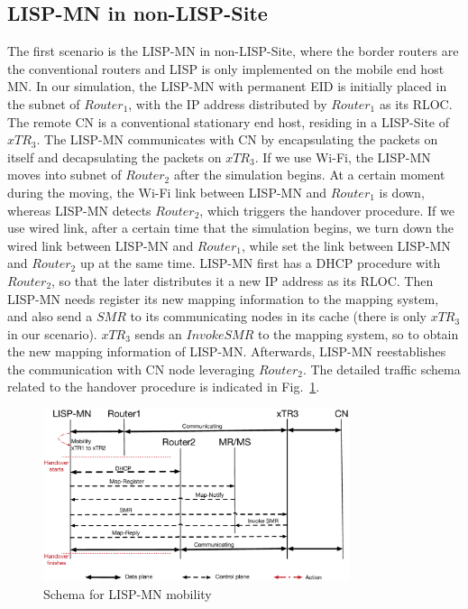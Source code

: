 


\subsection{LISP-MN in non-LISP-Site}
\label{sec:ns3_analysis_lispmn}
The first scenario is the LISP-MN in non-LISP-Site, where the border routers are the conventional routers and LISP is only implemented on the mobile end host MN. In our simulation, the LISP-MN with permanent EID is initially placed in the subnet of $Router_1$, with the IP address distributed by $Router_1$ as its RLOC. The remote CN is a conventional stationary end host, residing in a LISP-Site of $xTR_3$. The LISP-MN communicates with CN by encapsulating the packets on itself and decapsulating the packets on $xTR_3$. If we use Wi-Fi, the LISP-MN moves into subnet of $Router_2$ after the simulation begins. At a certain moment during the moving, the Wi-Fi link between LISP-MN and $Router_1$ is down, whereas LISP-MN detects $Router_2$, which triggers the handover procedure. If we use wired link, after a certain time that the simulation begins, we turn down the wired link between LISP-MN and $Router_1$, while set the link between LISP-MN and $Router_2$ up at the same time. LISP-MN first has a DHCP procedure with $Router_2$, so that the later distributes it a new IP address as its RLOC. Then LISP-MN needs register its new mapping information to the mapping system, and also send a $SMR$ to its communicating nodes in its cache (there is only $xTR_3$ in our scenario). $xTR_3$ sends an $Invoke SMR$ to the mapping system, so to obtain the new mapping information of LISP-MN. Afterwards, LISP-MN reestablishes the communication with CN node leveraging $Router_2$. The detailed traffic schema related to the handover procedure is indicated in Fig.~\ref{sim_schema_LISPMN}.  %
\begin{figure}[!th]
	\centering
	\includegraphics[width=0.8\textwidth]{Pics/Mobility_LISPMN_schema_SMR_simplify}
	\caption{Schema for LISP-MN mobility}
	\label{sim_schema_LISPMN}
\end{figure}

